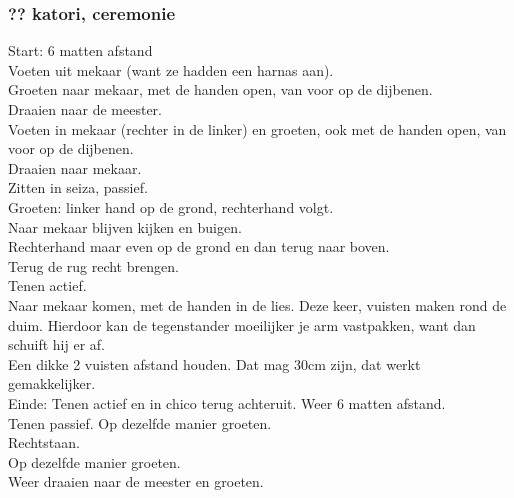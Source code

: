 \subsubsection{?? katori, ceremonie}
Start: 6 matten afstand\\
Voeten uit mekaar (want ze hadden een harnas aan).\\
Groeten naar mekaar, met de handen open, van voor op de dijbenen.\\
Draaien naar de meester.\\
Voeten in mekaar (rechter in de linker) en groeten, ook met de handen open, van voor op de dijbenen.\\
Draaien naar mekaar.\\
Zitten in seiza, passief.\\
Groeten: linker hand op de grond, rechterhand volgt.\\
Naar mekaar blijven kijken en buigen.\\
Rechterhand maar even op de grond en dan terug naar boven.\\
Terug de rug recht brengen.\\
Tenen actief.\\
Naar mekaar komen, met de handen in de lies. Deze keer, vuisten maken rond de duim. Hierdoor kan de tegenstander moeilijker je arm vastpakken, want dan schuift hij er af.\\
Een dikke 2 vuisten afstand houden. Dat mag 30cm zijn, dat werkt gemakkelijker.\\
Einde: Tenen actief en in chico terug achteruit. Weer 6 matten afstand.\\
Tenen passief. Op dezelfde manier groeten.\\
Rechtstaan.\\
Op dezelfde manier groeten.\\
Weer draaien naar de meester en groeten.

